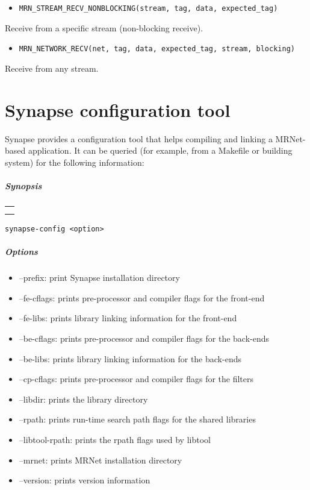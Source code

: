 \documentclass[twoside,a4,english,11pt]{book}
\begin{document}
\begin{itemize}
\item 
\begin{lstlisting} 
MRN_STREAM_RECV_NONBLOCKING(stream, tag, data, expected_tag)
\end{lstlisting} 
\end{itemize}
Receive from a specific stream (non-blocking receive).
 
\begin{itemize}
\item 
\begin{lstlisting} 
MRN_NETWORK_RECV(net, tag, data, expected_tag, stream, blocking)
\end{lstlisting} 
\end{itemize}
Receive from any stream.
 

\chapter{Synapse configuration tool}

Synapse provides a configuration tool that helps compiling and linking a MRNet-based application. 
It can be queried (for example, from a Makefile or building system) for the following information:

\paragraph{Synopsis}
\begin{tabular}{c}
\tabularnewline
\tabularnewline
\tabularnewline
\end{tabular}
\begin{lstlisting}[frame=single]
  synapse-config <option>
\end{lstlisting}

\paragraph{Options}
\begin{itemize}
 \item --prefix:        print Synapse installation directory 
 \item --fe-cflags:     prints pre-processor and compiler flags for the front-end
 \item --fe-libs:       prints library linking information for the front-end
 \item --be-cflags:     prints pre-processor and compiler flags for the back-ends
 \item --be-libs:       prints library linking information for the back-ends
 \item --cp-cflags:     prints pre-processor and compiler flags for the filters
 \item --libdir:        prints the library directory
 \item --rpath:         prints run-time search path flags for the shared libraries
 \item --libtool-rpath: prints the rpath flags used by libtool
 \item --mrnet:         prints MRNet installation directory
 \item --version:       prints version information
\end{itemize}



\end{document}
